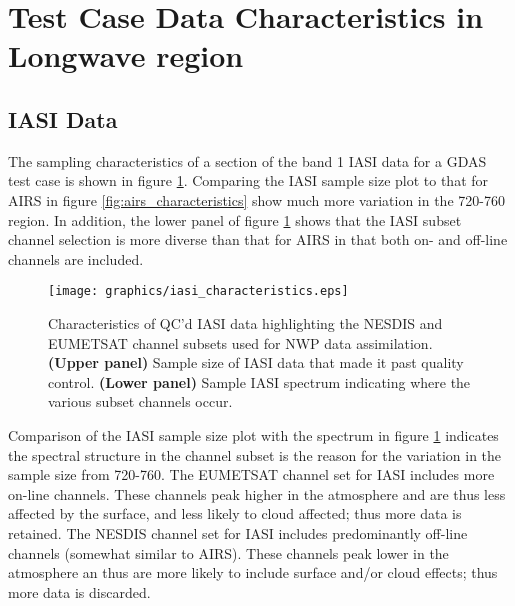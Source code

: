 \section{Test Case Data Characteristics in Longwave region}
\subsection{IASI Data}
The sampling characteristics of a section of the band 1 IASI data for a GDAS test case is shown in figure \ref{fig:iasi_characteristics}. Comparing the IASI sample size plot to that for AIRS in figure \ref{fig:airs_characteristics} show much more variation in the 720-760\invcm{} region. In addition, the lower panel of figure \ref{fig:iasi_characteristics} shows that the IASI subset channel selection is more diverse than that for AIRS in that both on- and off-line channels are included. 
\begin{figure}[htp]
  \centering
  \texttt{[image: graphics/iasi\_characteristics.eps]}
  \caption{Characteristics of QC'd IASI data highlighting the NESDIS and EUMETSAT channel subsets used for NWP data assimilation. \textbf{(Upper panel)} Sample size of IASI data that made it past quality control. \textbf{(Lower panel)} Sample IASI spectrum indicating where the various subset channels occur.}
  \label{fig:iasi_characteristics}
\end{figure}
Comparison of the IASI sample size plot with the spectrum in figure \ref{fig:iasi_characteristics} indicates the spectral structure in the channel subset is the reason for the variation in the sample size from 720-760\invcm{}. The EUMETSAT channel set for IASI includes more on-line channels. These channels peak higher in the atmosphere and are thus less affected by the surface, and less likely to cloud affected; thus more data is retained. The NESDIS channel set for IASI includes predominantly off-line channels (somewhat similar to AIRS). These channels peak lower in the atmosphere an thus are more likely to include surface and/or cloud effects; thus more data is discarded.

